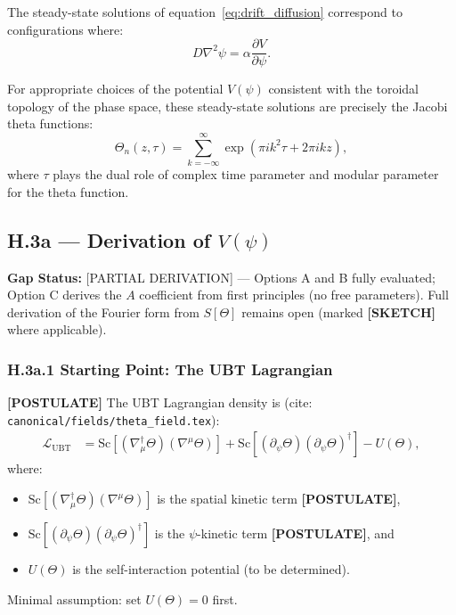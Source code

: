 The steady-state solutions of equation~\eqref{eq:drift_diffusion} correspond to configurations where:
\begin{equation}
D \nabla^2 \psi = \alpha \frac{\partial V}{\partial \psi}.
\end{equation}

For appropriate choices of the potential $V(\psi)$ consistent with the toroidal topology of the phase space, these steady-state solutions are precisely the Jacobi theta functions:
\begin{equation}
\Theta_n(z,\tau) = \sum_{k=-\infty}^{\infty} \exp\left(\pi i k^2 \tau + 2\pi i k z\right),
\end{equation}
where $\tau$ plays the dual role of complex time parameter and modular parameter for the theta function.

\subsection*{H.3a — Derivation of $V(\psi)$}

\textbf{Gap Status:} [PARTIAL DERIVATION] — Options A and B fully evaluated;
Option C derives the $A$ coefficient from first principles (no free parameters).
Full derivation of the Fourier form from $S[\Theta]$ remains open (marked
\textbf{[SKETCH]} where applicable).

\subsubsection*{H.3a.1 Starting Point: The UBT Lagrangian}

\textbf{[POSTULATE]} The UBT Lagrangian density is (cite: \texttt{canonical/fields/theta\_field.tex}):
\begin{align}
\mathcal{L}_\mathrm{UBT}
&= \mathrm{Sc}\!\left[(\nabla^\dagger_\mu\Theta)(\nabla^\mu\Theta)\right]
 + \mathrm{Sc}\!\left[(\partial_\psi\Theta)(\partial_\psi\Theta)^\dagger\right]
 - U(\Theta),  \label{eq:L_UBT_explicit}
\end{align}
where:
\begin{itemize}
\item $\mathrm{Sc}\!\left[(\nabla^\dagger_\mu\Theta)(\nabla^\mu\Theta)\right]$ is the
  spatial kinetic term \textbf{[POSTULATE]},
\item $\mathrm{Sc}\!\left[(\partial_\psi\Theta)(\partial_\psi\Theta)^\dagger\right]$ is the
  $\psi$-kinetic term \textbf{[POSTULATE]}, and
\item $U(\Theta)$ is the self-interaction potential (to be determined).
\end{itemize}
Minimal assumption: set $U(\Theta)=0$ first.


